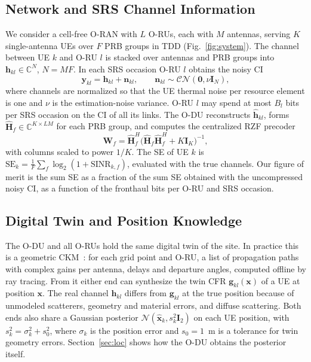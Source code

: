 \documentclass[journal]{IEEEtran}
\newcommand{\vect}[1]{\mathbf{#1}}
\begin{document}
\subsection{Network and SRS Channel Information}
We consider a cell-free O-RAN with $L$ O-RUs, each with $M$ antennas, serving $K$ single-antenna UEs over $F$ PRB groups in TDD (Fig.~\ref{fig:system}). The channel between UE $k$ and O-RU $l$ is stacked over antennas and PRB groups into $\vect{h}_{kl}\in\mathbb{C}^{N}$, $N=MF$. In each SRS occasion O-RU $l$ obtains the noisy CI
\begin{equation}
\vect{y}_{kl}=\vect{h}_{kl}+\vect{n}_{kl},\qquad \vect{n}_{kl}\sim\mathcal{CN}(\vect{0},\nu\vect{I}_N),
\end{equation}
where channels are normalized so that the UE thermal noise per resource element is one and $\nu$ is the estimation-noise variance. O-RU $l$ may spend at most $B_l$ bits per SRS occasion on the CI of all its links. The O-DU reconstructs $\hat{\vect{h}}_{kl}$, forms $\hat{\vect{H}}_f\in\mathbb{C}^{K\times LM}$ for each PRB group, and computes the centralized RZF precoder
\begin{equation}\label{eq:rzf}
\vect{W}_f=\hat{\vect{H}}_f^{H}\big(\hat{\vect{H}}_f\hat{\vect{H}}_f^{H}+K\vect{I}_K\big)^{-1},
\end{equation}
with columns scaled to power $1/K$. The SE of UE $k$ is $\mathrm{SE}_k=\frac{1}{F}\sum_f\log_2(1+\mathrm{SINR}_{k,f})$, evaluated with the true channels. Our figure of merit is the sum SE as a fraction of the sum SE obtained with the uncompressed noisy CI, as a function of the fronthaul bits per O-RU and SRS occasion.

\subsection{Digital Twin and Position Knowledge}
The O-DU and all O-RUs hold the same digital twin of the site. In practice this is a geometric CKM~\cite{zeng2024ckm}: for each grid point and O-RU, a list of propagation paths with complex gains per antenna, delays and departure angles, computed offline by ray tracing. From it either end can synthesize the twin CFR $\vect{g}_{kl}(\vect{x})$ of a UE at position $\vect{x}$. The real channel $\vect{h}_{kl}$ differs from $\vect{g}_{kl}$ at the true position because of unmodeled scatterers, geometry and material errors, and diffuse scattering. Both ends also share a Gaussian posterior $\mathcal{N}(\hat{\vect{x}}_k,s_k^2\vect{I}_2)$ on each UE position, with $s_k^2=\sigma_k^2+s_0^2$, where $\sigma_k$ is the position error and $s_0=1$~m is a tolerance for twin geometry errors. Section~\ref{sec:loc} shows how the O-DU obtains the posterior itself.
\end{document}
